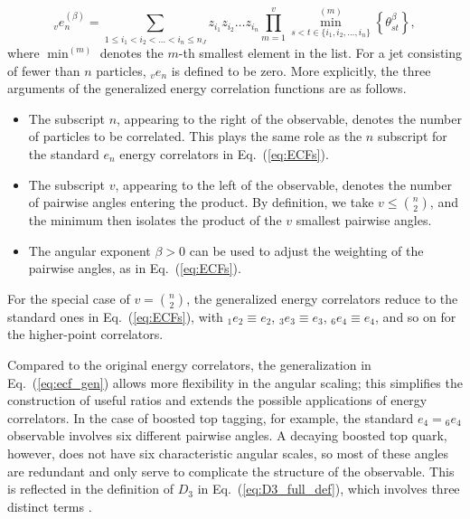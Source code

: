 \documentclass[11pt,letterpaper]{article}
\DeclareRobustCommand{\Eq}[1]{Eq.~(\ref{#1})}
\newcommand{\ecfnobeta}[1]{e_{#1}}
\newcommand{\ecfvar}[3]{{_{#1}e_{#2}^{(#3)}}}
\newcommand{\ecfvarnobeta}[2]{{_{#1}e_{#2}}}
\newcommand{\Dobsnobeta}[1]{D_{#1}}
\begin{document}
\begin{equation}\label{eq:ecf_gen}
\ecfvar{v}{n}{\beta} = \sum_{1 \leq i_1 < i_2 < \dots < i_n \leq n_J} z_{i_1} z_{i_2} \dots z_{i_n} \prod_{m = 1}^{v} \min^{(m)}_{s < t \in \{i_1, i_2 , \dots, i_n \}} \left\{ \theta_{st}^{\beta} \right\},
\end{equation}
where $\min^{(m)}$ denotes the $m$-th smallest element in the list.  For a jet consisting of fewer than $n$ particles, $\ecfvarnobeta{v}{n}$ is defined to be zero.  More explicitly, the three arguments of the generalized energy correlation functions are as follows.
\begin{itemize}
\item The subscript $n$, appearing to the right of the observable, denotes the number of particles to be correlated.  This plays the same role as the $n$ subscript for the standard $e_n$ energy correlators in \Eq{eq:ECFs}. 
\item The subscript $v$, appearing to the left of the observable, denotes the number of pairwise angles entering the product.  By definition, we take $v \leq \binom{n}{2}$, and the minimum then isolates the product of the $v$ smallest pairwise angles.
\item The angular exponent $\beta>0$ can be used to adjust the weighting of the pairwise angles, as in \Eq{eq:ECFs}.
\end{itemize}
For the special case of $v = \binom{n}{2}$, the generalized energy correlators reduce to the standard ones in \Eq{eq:ECFs}, with $\ecfvarnobeta{1}{2}\equiv\ecfnobeta{2}$, $\ecfvarnobeta{3}{3}\equiv\ecfnobeta{3}$, $\ecfvarnobeta{6}{4}\equiv\ecfnobeta{4}$, and so on for the higher-point correlators. 

Compared to the original energy correlators, the generalization in \Eq{eq:ecf_gen} allows more flexibility in the angular scaling; this simplifies the construction of useful ratios and extends the possible applications of energy correlators.  In the case of boosted top tagging, for example, the standard $\ecfnobeta{4}=\ecfvarnobeta{6}{4}$ observable involves six different pairwise angles.  A decaying boosted top quark, however, does not have six characteristic angular scales, so most of these angles are redundant and only serve to complicate the structure of the observable.  This is reflected in the definition of $\Dobsnobeta{3}$ in \Eq{eq:D3_full_def}, which involves three distinct terms \cite{Larkoski:2014zma}.
\end{document}
